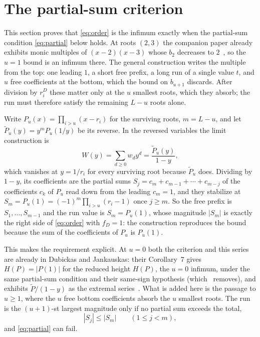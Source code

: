 \documentclass[11pt]{article}
\theoremstyle{definition}
\theoremstyle{plain}
\begin{document}
\section{The partial-sum criterion}\label{sec:criterion}

This section proves that \eqref{eq:order} is the infimum exactly when the
partial-sum condition \eqref{eq:partial} below holds.  At roots $(2,3)$ the
companion paper already exhibits monic multiples of $(x-2)(x-3)$ whose
$b_2$ decreases to $2$~\cite[Proposition~4.4]{coefficient-mass}, so the $u=1$
bound is an infimum there.  The general construction writes the multiple
from the top: one leading $1$, a short free prefix, a long run of a single
value $t$, and $u$ free coefficients at the bottom, which the bound on
$b_{u+1}$ discards.  After division by
$r_i^D$ these matter only at the $u$ smallest roots,
which they absorb; the run must therefore satisfy the remaining $L-u$ roots
alone.

Write $P_u(x)=\prod_{i>u}(x-r_i)$ for the
surviving roots, $m=L-u$, and let $\widetilde P_u(y)=y^mP_u(1/y)$ be its
reverse.  In the reversed variables the limit construction is
\begin{equation}\label{eq:wgen}
  W(y)=\sum_{d\ge0}w_dy^d=\frac{\widetilde P_u(y)}{1-y},
\end{equation}
which vanishes at $y=1/r_i$ for every surviving root because
$\widetilde P_u$ does.  Dividing by $1-y$, its coefficients are the partial sums
$S_j=c_m+c_{m-1}+\cdots+c_{m-j}$ of the coefficients $c_k$ of $P_u$ read down
from the leading $c_m=1$, and they stabilize at
$S_m=P_u(1)=(-1)^m\prod_{i>u}(r_i-1)$ once $j\ge m$.  So the free prefix is
$S_1,\ldots,S_{m-1}$ and the run value is $S_m=P_u(1)$, whose magnitude
$|S_m|$ is exactly the right side of \eqref{eq:order} with $f_D=1$: the construction reproduces the bound because the sum of the
coefficients of $P_u$ is $P_u(1)$.

This makes the requirement explicit.  At $u=0$ both the criterion and this
series are already in Dubickas and Jankauskas: their Corollary~7 gives
$H(P)=|P(1)|$ for the reduced height $H(P)$, the $u=0$ infimum, under the
same partial-sum condition and their same-sign hypothesis (which~\cite[Lemma~2.1]{coefficient-mass}
removes), and exhibits $\widetilde P/(1-y)$ as the extremal
series~\cite[Corollary~7]{dj}.  What is added here is the passage to $u\ge1$,
where the $u$ free bottom coefficients absorb the $u$ smallest roots.  The run is
the $(u+1)$-st largest magnitude only if no partial sum exceeds the total,
\begin{equation}\label{eq:partial}
  |S_j|\le|S_m|\qquad(1\le j<m),
\end{equation}
and \eqref{eq:partial} can fail.
\end{document}

